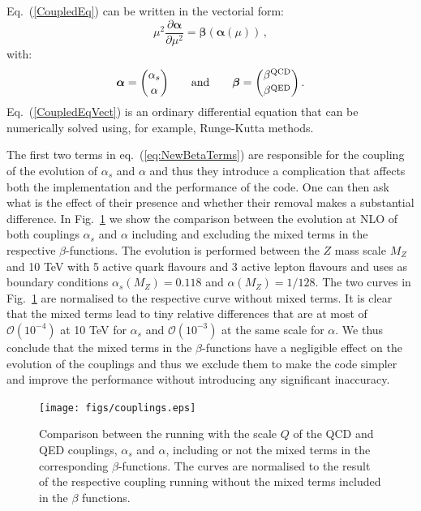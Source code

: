 Eq.~(\ref{CoupledEq}) can be written in the vectorial form:
\begin{equation}\label{CoupledEqVect}
\mu^2\frac{\partial {\bm \alpha}}{\partial \mu^2} = {\bm \beta}\left({\bm \alpha}(\mu)\right)\,,
\end{equation}
with:
\begin{equation}
  {\bm \alpha} = {\alpha_s \choose \alpha}\qquad\mbox{and}\qquad  {\bm \beta} = {\beta^{\rm QCD} \choose \beta^{\rm QED}}\,.
\end{equation}
Eq.~(\ref{CoupledEqVect}) is an ordinary differential equation that
can be numerically solved using, for example, Runge-Kutta methods.

The first two terms in eq.~(\ref{eq:NewBetaTerms}) are responsible for
the coupling of the evolution of $\alpha_s$ and $\alpha$ and thus they
introduce a complication that affects both the implementation and the
performance of the code.
%
One can then ask what is the effect of their
presence and whether their removal makes a substantial difference. In
Fig.~\ref{fig:CouplingEvol} we show the comparison between the
evolution at NLO of both couplings $\alpha_s$ and $\alpha$ including
and excluding the mixed terms in the respective
$\beta$-functions.
%
The evolution is performed between the $Z$ mass
scale $M_Z$ and 10 TeV with 5 active quark flavours and 3 active
lepton flavours and uses as boundary conditions
$\alpha_s(M_Z) = 0.118$ and $\alpha(M_Z) = 1/128$.
%
The two curves in
Fig.~\ref{fig:CouplingEvol} are normalised to the respective curve
without mixed terms. It is clear that the mixed terms lead to tiny
relative differences that are at most of $\mathcal{O}(10^{-4})$ at 10
TeV for $\alpha_s$ and $\mathcal{O}(10^{-3})$ at the same scale for
$\alpha$.
%
We thus conclude that the mixed terms in the $\beta$-functions
have a negligible effect on the evolution of the couplings and thus we
exclude them to make the code simpler and improve the performance
without introducing any significant inaccuracy.

\begin{figure}[h]
\texttt{[image: figs/couplings.eps]} 
\caption{Comparison between the running with the scale
$Q$ of the QCD and QED couplings,
  $\alpha_s$ and $\alpha$, including or not the mixed terms in
  the corresponding $\beta$-functions.
%
  The curves are normalised to the result of the respective coupling
  running without the mixed terms included in the $\beta$ functions.}
\label{fig:CouplingEvol}
\end{figure}

